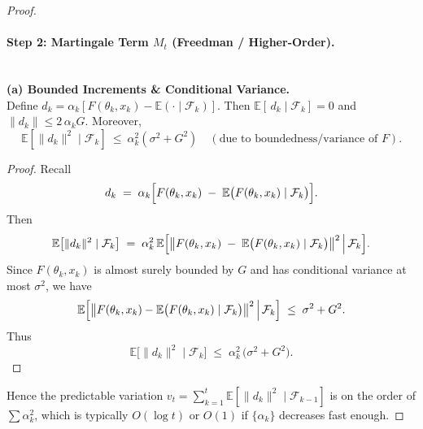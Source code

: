 \begin{proof}
\paragraph{Step 2: Martingale Term \boldmath$M_t$ (Freedman / Higher-Order).}\;\\

\textbf{(a) Bounded Increments \& Conditional Variance.}\;\\
Define $d_k=\alpha_k[F(\theta_k,x_k)-\mathbb{E}(\cdot\mid\mathcal{F}_k)]$.  Then $\mathbb{E}[\,d_k\mid\mathcal{F}_k]=0$ and $\|d_k\|\le2\,\alpha_k G$.  Moreover,
\[
   \mathbb{E}[\|d_k\|^2 \mid \mathcal{F}_k]
   ~\le~
   \alpha_k^2(\sigma^2+G^2)
   \quad
   (\text{due to boundedness/variance of }F).
\]
\begin{proof}
Recall 
\[
  d_k \;=\; \alpha_k \Bigl[
      F(\theta_k,x_k) 
      \;-\; 
      \mathbb{E}\bigl(F(\theta_k,x_k) \mid \mathcal{F}_k\bigr)
  \Bigr].
\]
Then
\[
  \mathbb{E}\bigl[\|d_k\|^2 \mid \mathcal{F}_k\bigr]
  \;=\;
  \alpha_k^2 
  \,\mathbb{E}\Bigl[
    \bigl\|F(\theta_k,x_k) 
    \;-\; 
    \mathbb{E}\bigl(F(\theta_k,x_k) \mid \mathcal{F}_k\bigr)\bigr\|^2
    \,\Big|\,
    \mathcal{F}_k
  \Bigr].
\]
Since \(F(\theta_k,x_k)\) is almost surely bounded by \(G\) and has conditional variance at most \(\sigma^2\), we have
\[
  \mathbb{E}\Bigl[
    \bigl\|F(\theta_k,x_k) 
    - 
    \mathbb{E}\bigl(F(\theta_k,x_k) \mid \mathcal{F}_k\bigr)\bigr\|^2
    \,\Big|\,
    \mathcal{F}_k
  \Bigr]
  \;\le\;
  \sigma^2 + G^2.
\]
Thus
\[
  \mathbb{E}\bigl[\|d_k\|^2 \mid \mathcal{F}_k\bigr]
  \;\le\;
  \alpha_k^2 \,\bigl(\sigma^2 + G^2\bigr).
\]
\end{proof}
Hence the predictable variation $v_t=\sum_{k=1}^t \mathbb{E}[\|d_k\|^2\mid\mathcal{F}_{k-1}]$ is on the order of $\sum\alpha_k^2$, which is typically $O(\log t)$ or $O(1)$ if $\{\alpha_k\}$ decreases fast enough.


\end{proof}
